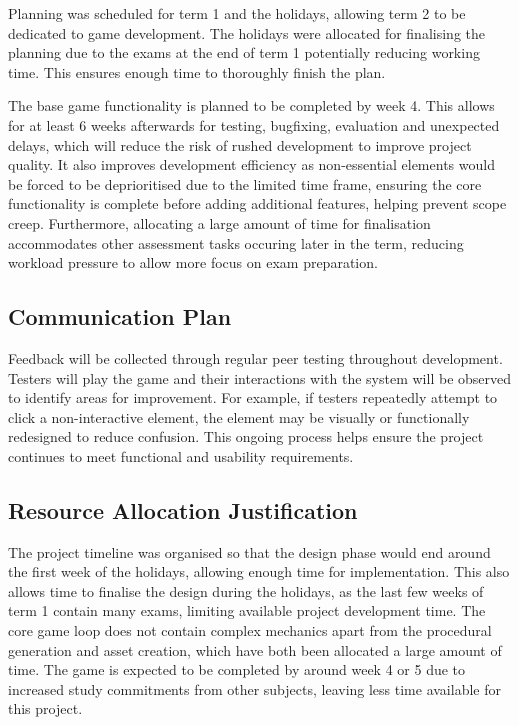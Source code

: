 \documentclass[14pt]{article}
\begin{document}
Planning was scheduled for term 1 and the holidays, allowing term 2 to be dedicated to game development.
The holidays were allocated for finalising the planning due to the exams at the end of term 1 potentially reducing working time.
This ensures enough time to thoroughly finish the plan.

The base game functionality is planned to be completed by week 4.
This allows for at least 6 weeks afterwards for testing, bugfixing, evaluation and unexpected delays, which will reduce the risk of rushed development to improve project quality.
It also improves development efficiency as non-essential elements would be forced to be deprioritised due to the limited time frame, ensuring the core functionality is complete before adding additional features, helping prevent scope creep.
Furthermore, allocating a large amount of time for finalisation accommodates other assessment tasks occuring later in the term, reducing workload pressure to allow more focus on exam preparation.

\subsection{Communication Plan}
Feedback will be collected through regular peer testing throughout development.
Testers will play the game and their interactions with the system will be observed to identify areas for improvement. For example, if testers repeatedly attempt to click a non-interactive element, the element may be visually or functionally redesigned to reduce confusion.
This ongoing process helps ensure the project continues to meet functional and usability requirements.

\subsection{Resource Allocation Justification}
The project timeline was organised so that the design phase would end around the first week of the holidays, allowing enough time for implementation.
This also allows time to finalise the design during the holidays, as the last few weeks of term 1 contain many exams, limiting available project development time.
The core game loop does not contain complex mechanics apart from the procedural generation and asset creation, which have both been allocated a large amount of time.
The game is expected to be completed by around week 4 or 5 due to increased study commitments from other subjects, leaving less time available for this project.
\end{document}
